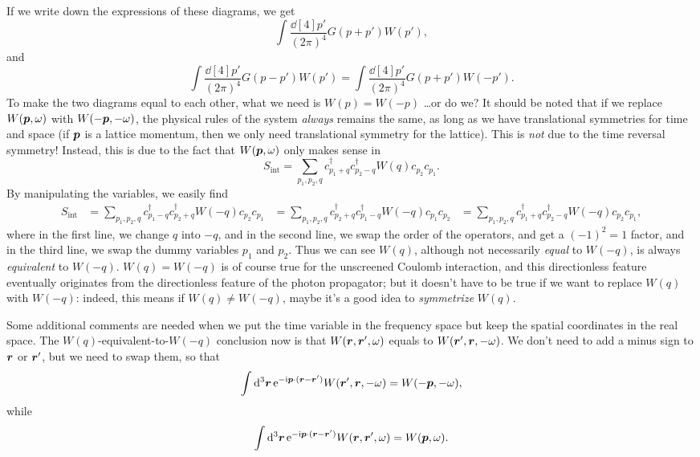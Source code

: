 \documentclass[hyperref, a4paper]{report}
\newcommand*{\ii}{\mathrm{i}}
\newcommand*{\ee}{\mathrm{e}}
\def\\{}%
\begin{document}
If we write down the expressions of these diagrams, 
we get 
\[
    \int \frac{\dd[4]{p'}}{(2\pi)^4} G(p + p') W(p'),
\] 
and 
\[
    \int \frac{\dd[4]{p'}}{(2\pi)^4} G(p - p') W(p')
    = \int \frac{\dd[4]{p'}}{(2\pi)^4} G(p + p') W(- p').
\]
To make the two diagrams equal to each other, 
what we need is $W(p) = W(- p)$ \dots or do we?
It should be noted that if we replace 
$W(\vb*{p}, \omega)$ with $W(- \vb*{p}, - \omega)$,
the physical rules of the system \emph{always} remains the same,
as long as we have translational symmetries for time and space 
(if $\vb*{p}$ is a lattice momentum,
then we only need translational symmetry for the lattice).
This is \emph{not} due to the time reversal symmetry!
Instead, this is due to the fact that $W(\vb*{p}, \omega)$
only makes sense in 
\[
    S_{\text{int}} = \sum_{p_1, p_2, q} 
    c^\dagger_{p_1 + q } c^\dagger_{p_2 - q} W(q) c_{p_2} c_{p_1}.
\]
By manipulating the variables, we easily find 
\[
    \begin{aligned}
        S_{\text{int}} &= 
        \sum_{p_1, p_2, q} 
        c^\dagger_{p_1 - q } c^\dagger_{p_2 + q} W(-q) c_{p_2} c_{p_1} \\
        &= \sum_{p_1, p_2, q} 
        c^\dagger_{p_2 + q} c^\dagger_{p_1 - q } W(-q) c_{p_1} c_{p_2} \\
        &= \sum_{p_1, p_2, q} 
        c^\dagger_{p_1 + q} c^\dagger_{p_2 - q } W(-q) c_{p_2} c_{p_1},
    \end{aligned}
\]
where in the first line, 
we change $q$ into $-q$,
and in the second line, we swap the order of the operators, 
and get a $(-1)^2 = 1$ factor,
and in the third line, 
we swap the dummy variables $p_1$ and $p_2$.
Thus we can see $W(q)$, although not necessarily \emph{equal} to $W(-q)$,
is always \emph{equivalent} to $W(-q)$.
$W(q) = W(-q)$ is of course true for the unscreened Coulomb interaction,
and this directionless feature eventually originates from 
the directionless feature of the photon propagator;
but it doesn't have to be true 
if we want to replace $W(q)$ with $W(-q)$:
indeed, this means if $W(q) \neq W(-q)$,
maybe it's a good idea to \emph{symmetrize} $W(q)$.

Some additional comments are needed when we put the time variable in the frequency space 
but keep the spatial coordinates in the real space.
The $W(q)$-equivalent-to-$W(-q)$ conclusion 
now is that $W(\vb*{r}, \vb*{r}', \omega)$ equals to 
$W(\vb*{r}', \vb*{r}, - \omega)$.
We don't need to add a minus sign to $\vb*{r}$ or $\vb*{r}'$,
but we need to swap them,
so that 
\[
    \int \dd[3]{\vb*{r}} \ee^{- \ii \vb*{p} \cdot (\vb*{r} - \vb*{r}')} W(\vb*{r}', \vb*{r}, - \omega)
    = W(- \vb*{p}, - \omega) ,
\]
while 
\[
    \int \dd[3]{\vb*{r}} \ee^{- \ii \vb*{p} \cdot (\vb*{r} - \vb*{r}')} W(\vb*{r}, \vb*{r}', \omega)
    = W(\vb*{p}, \omega).
\]
\end{document}
